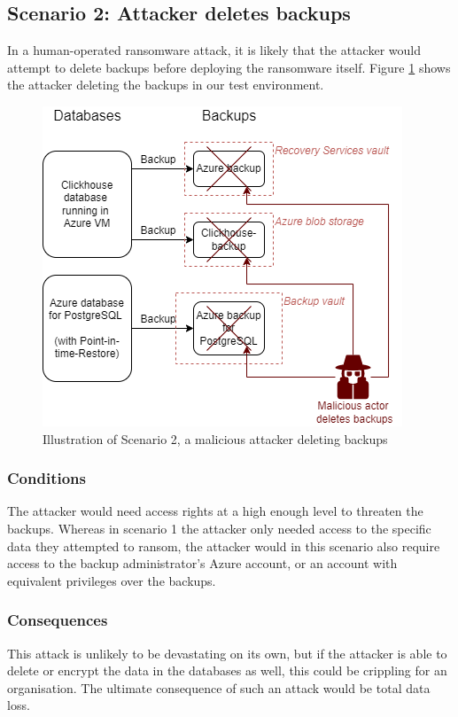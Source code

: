 \subsection{Scenario 2: Attacker deletes backups}
In a human-operated ransomware attack, it is likely that the attacker would attempt
to delete backups before deploying the ransomware itself. Figure \ref{fig:scenario 2} shows the attacker deleting the backups in our test environment. 
\begin{figure}[h!]
    \centering
    \includegraphics[width=.9\linewidth]{figures/Scenario2.png}
    \caption{Illustration of Scenario 2, a malicious attacker deleting backups}
    \label{fig:scenario 2}
\end{figure}

\subsubsection{Conditions}
The attacker would need access rights at a high enough level to threaten the backups. Whereas in scenario 1 the attacker only needed access to the specific data they attempted to ransom, the attacker would in this scenario also require access to the backup administrator's Azure account, or an account with equivalent privileges over the backups.   

\subsubsection{Consequences}
This attack is unlikely to be devastating on its own, 
but if the attacker is able to delete or encrypt the data in the databases as well, 
this could be crippling for an organisation. 
The ultimate consequence of such an attack would be total data loss.

